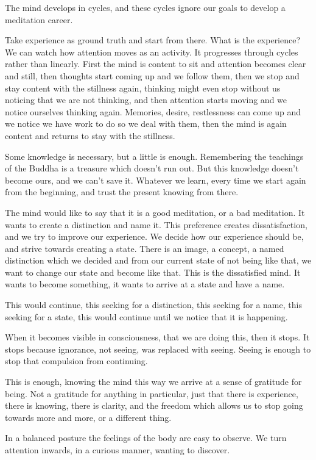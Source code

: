 The mind develops in cycles, and these cycles ignore our goals to
develop a meditation career.

Take experience as ground truth and start from there. What is the
experience? We can watch how attention moves as an activity. It
progresses through cycles rather than linearly. First the mind is
content to sit and attention becomes clear and still, then thoughts
start coming up and we follow them, then we stop and stay content with
the stillness again, thinking might even stop without us noticing that
we are not thinking, and then attention starts moving and we notice
ourselves thinking again. Memories, desire, restlessness can come up and
we notice we have work to do so we deal with them, then the mind is
again content and returns to stay with the stillness.

Some knowledge is necessary, but a little is enough. Remembering the
teachings of the Buddha is a treasure which doesn't run out. But this
knowledge doesn't become ours, and we can't save it. Whatever we learn,
every time we start again from the beginning, and trust the present
knowing from there.

The mind would like to say that it is a good meditation, or a bad
meditation. It wants to create a distinction and name it. This
preference creates dissatisfaction, and we try to improve our
experience. We decide how our experience should be, and strive towards
creating a state. There is an image, a concept, a named distinction
which we decided and from our current state of not being like that, we
want to change our state and become like that. This is the dissatisfied
mind. It wants to become something, it wants to arrive at a state and
have a name.

This would continue, this seeking for a distinction, this seeking for a
name, this seeking for a state, this would continue until we notice that
it is happening.

When it becomes visible in consciousness, that we are doing this, then
it stops. It stops because ignorance, not seeing, was replaced with
seeing. Seeing is enough to stop that compulsion from continuing.

This is enough, knowing the mind this way we arrive at a sense of
gratitude for being. Not a gratitude for anything in particular, just
that there is experience, there is knowing, there is clarity, and the
freedom which allows us to stop going towards more and more, or a
different thing.

In a balanced posture the feelings of the body are easy to observe. We
turn attention inwards, in a curious manner, wanting to discover.

